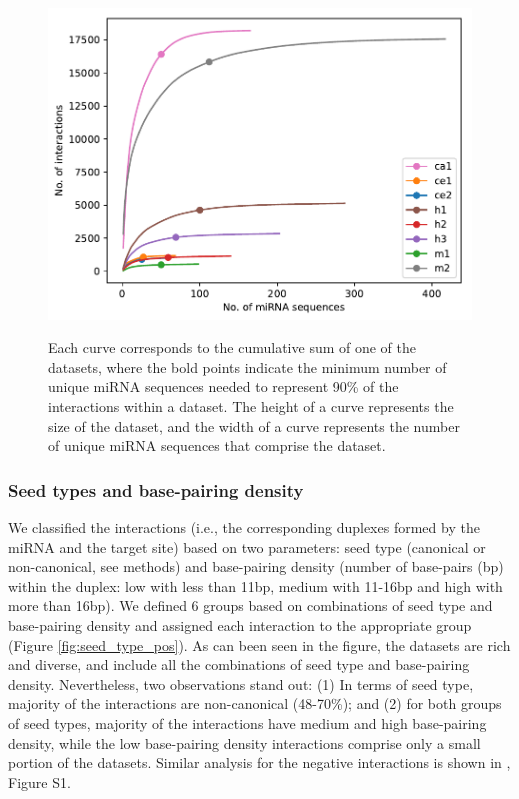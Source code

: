 \documentclass{bmcart}
\begin{document}
\begin{figure}[h!]
  \caption{ Each curve corresponds to the cumulative sum of one of the datasets, where the bold points indicate the minimum number of unique miRNA sequences needed to represent 90\% of the interactions within a dataset. The height of a curve represents the size of the dataset, and the width of a curve represents the number of unique miRNA sequences that comprise the dataset.}
      \includegraphics[width = 1\textwidth]{Results/mirna_dist.pdf}
      \label{fig:datasetplot}
      \end{figure}


\subsubsection*{Seed types and base-pairing density}
We classified the interactions (i.e., the corresponding duplexes formed by the miRNA and the target site) based on two parameters: seed type (canonical or non-canonical, see methods) and base-pairing density (number of base-pairs (bp) within the duplex: low with less than 11bp, medium with 11-16bp and high with more than 16bp). We defined 6 groups based on  combinations of seed type and base-pairing density and assigned each interaction to the appropriate group (Figure \ref{fig:seed_type_pos}). As can been seen in the figure, the datasets are rich and diverse, and include all the combinations of seed type and base-pairing density.
Nevertheless, two observations stand out: 
(1) In terms of seed type, majority of the interactions are non-canonical (48-70\%); and (2) for both groups of seed types,  majority of the interactions have medium and high base-pairing density, while the low base-pairing density interactions comprise only a small portion of the datasets. Similar analysis for the negative interactions is shown in , Figure S1.
\end{document}
